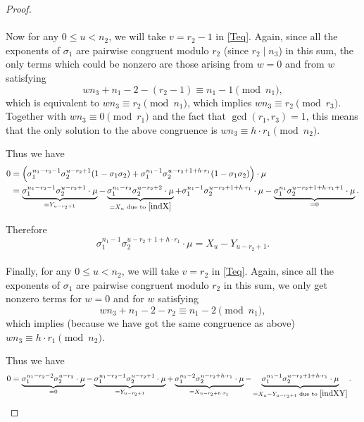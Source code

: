 \documentclass[12pt,a4paper]{article}
\theoremstyle{definition}
\begin{document}
\begin{proof}
\paragraph*{}
Now for any $0\leq u< n_2$, we will take $v=r_2-1$ in \eqref{Teq}. Again, since all the exponents of $\sigma_1$ are pairwise congruent modulo $r_2$ (since $r_2\mid n_3$) in this sum, the only terms which could be nonzero are those arising from $w=0$ and from $w$ satisfying
$$wn_3+n_1-2-(r_2-1)\equiv n_1-1 \pmod{n_1},$$
which is equivalent to $wn_3\equiv r_2\pmod{n_1}$, which implies $wn_3\equiv r_2\pmod{r_3}$. Together with $wn_3\equiv 0\pmod{r_1}$ and the fact that $\gcd(r_1,r_3)=1$, this means that the only solution to the above congruence is $wn_3\equiv h\cdot r_1\pmod{n_2}$.

Thus we have 
\begin{align*}
0&=\left(\sigma_1^{n_1-r_2-1}\sigma_2^{u-r_2+1}(1-\sigma_1\sigma_2)+\sigma_1^{n_1-1}\sigma_2^{u-r_2+1+h\cdot r_1}(1-\sigma_1\sigma_2)\right)\cdot \mu\\
&=\underbrace{\sigma_1^{n_1-r_2-1}\sigma_2^{u-r_2+1}\cdot\mu}_{=Y_{u-r_2+1}}-\underbrace{\sigma_1^{n_1-r_2}\sigma_2^{u-r_2+2}\cdot\mu}_{=X_u \text{ due to } \eqref{indX}}+\sigma_1^{n_1-1}\sigma_2^{u-r_2+1+h\cdot r_1}\cdot \mu-\underbrace{\sigma_1^{n_1}\sigma_2^{u-r_2+1+h\cdot r_1+1}\cdot \mu}_{=0}.
\end{align*}

Therefore
\begin{equation}\label{indXY}
\sigma_1^{n_1-1}\sigma_2^{u-r_2+1+h\cdot r_1}\cdot \mu = X_u -Y_{u-r_2+1}.
\end{equation}

\paragraph*{}
Finally, for any $0\leq u< n_2$, we will take $v=r_2$ in \eqref{Teq}. Again, since all the exponents of $\sigma_1$ are pairwise congruent modulo $r_2$ in this sum, we only get nonzero terms for $w=0$ and for $w$ satisfying
$$wn_3+n_1-2-r_2\equiv n_1-2 \pmod{n_1},$$ which implies (because we have got the same congruence as above) $wn_3\equiv h\cdot r_1\pmod{n_2}$.

Thus we have 
\begin{align*}
0&=\underbrace{\sigma_1^{n_1-r_2-2}\sigma_2^{u-r_2}\cdot\mu}_{=0}-\underbrace{\sigma_1^{n_1-r_2-1}\sigma_2^{u-r_2+1}\cdot\mu}_{=Y_{u-r_2+1}}
+\underbrace{\sigma_1^{n_1-2}\sigma_2^{u-r_2+h\cdot r_1}\cdot \mu}_{=X_{u-r_2+h\cdot r_1}}-\underbrace{\sigma_1^{n_1-1}\sigma_2^{u-r_2+1+h\cdot r_1}\cdot \mu}_{=X_u-Y_{u-r_2+1} \text{ due to } \eqref{indXY}}.
\end{align*}


\end{proof}
\end{document}
